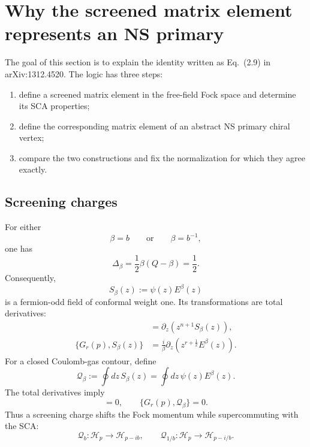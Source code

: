 \documentclass[11pt]{article}
\begin{document}
\section{Why the screened matrix element represents an NS primary}

The goal of this section is to explain the identity written as Eq.~(2.9) in
arXiv:1312.4520.  The logic has three steps:
\begin{enumerate}
 \item define a screened matrix element in the free-field Fock space and
       determine its SCA properties;
 \item define the corresponding matrix element of an abstract NS primary
       chiral vertex;
 \item compare the two constructions and fix the normalization for which
       they agree exactly.
\end{enumerate}

\subsection{Screening charges}

For either
\begin{equation}
 \beta=b
 \qquad\text{or}\qquad
 \beta=b^{-1},
 \label{eq:screening-momenta}
\end{equation}
one has
\begin{equation}
 \Delta_\beta
 =\frac12\beta(Q-\beta)
 =\frac12.
 \label{eq:screening-weight-half}
\end{equation}
Consequently,
\begin{equation}
 S_\beta(z):=\psi(z)E^\beta(z)
 \label{eq:screening-current}
\end{equation}
is a fermion-odd field of conformal weight one.  Its transformations are
total derivatives:
\begin{align}
 [L_n(p),S_\beta(z)]
 &=
 \partial_z\!\left(z^{n+1}S_\beta(z)\right),
 \label{eq:screening-L-total-derivative}
 \\
 \{G_r(p),S_\beta(z)\}
 &=
 \frac{i}{\beta}
 \partial_z\!\left(z^{r+\frac12}E^\beta(z)\right).
 \label{eq:screening-G-total-derivative}
\end{align}
For a closed Coulomb-gas contour, define
\begin{equation}
 \mathcal Q_\beta
 :=
 \oint dz\,S_\beta(z)
 =
 \oint dz\,\psi(z)E^\beta(z).
 \label{eq:screening-charge-general}
\end{equation}
The total derivatives imply
\begin{equation}
 [L_n(p),\mathcal Q_\beta]=0,
 \qquad
 \{G_r(p),\mathcal Q_\beta\}=0.
 \label{eq:screening-supercommutes}
\end{equation}
Thus a screening charge shifts the Fock momentum while supercommuting with
the SCA:
\begin{equation}
 \mathcal Q_b:\mathcal H_p\longrightarrow\mathcal H_{p-ib},
 \qquad
 \mathcal Q_{1/b}:\mathcal H_p\longrightarrow\mathcal H_{p-i/b}.
 \label{eq:screening-momentum-shifts}
\end{equation}
\end{document}
